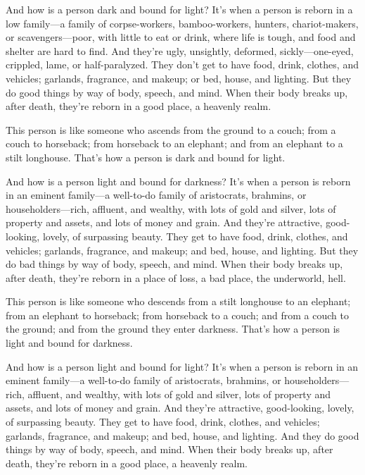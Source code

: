 \documentclass[12pt,openany]{book}%
\begin{document}
And how is a person dark and bound for light? It’s when a person is reborn in a low family—a family of corpse-workers, bamboo-workers, hunters, chariot-makers, or scavengers—poor, with little to eat or drink, where life is tough, and food and shelter are hard to find. And they’re ugly, unsightly, deformed, sickly—one-eyed, crippled, lame, or half-paralyzed. They don’t get to have food, drink, clothes, and vehicles; garlands, fragrance, and makeup; or bed, house, and lighting. But they do good things by way of body, speech, and mind. When their body breaks up, after death, they’re reborn in a good place, a heavenly realm. 

This person is like someone who ascends from the ground to a couch; from a couch to horseback; from horseback to an elephant; and from an elephant to a stilt longhouse. That’s how a person is dark and bound for light. 

And how is a person light and bound for darkness? It’s when a person is reborn in an eminent family—a well-to-do family of aristocrats, brahmins, or householders—rich, affluent, and wealthy, with lots of gold and silver, lots of property and assets, and lots of money and grain. And they’re attractive, good-looking, lovely, of surpassing beauty. They get to have food, drink, clothes, and vehicles; garlands, fragrance, and makeup; and bed, house, and lighting. But they do bad things by way of body, speech, and mind. When their body breaks up, after death, they’re reborn in a place of loss, a bad place, the underworld, hell. 

This person is like someone who descends from a stilt longhouse to an elephant; from an elephant to horseback; from horseback to a couch; and from a couch to the ground; and from the ground they enter darkness. That’s how a person is light and bound for darkness. 

And how is a person light and bound for light? It’s when a person is reborn in an eminent family—a well-to-do family of aristocrats, brahmins, or householders—rich, affluent, and wealthy, with lots of gold and silver, lots of property and assets, and lots of money and grain. And they’re attractive, good-looking, lovely, of surpassing beauty. They get to have food, drink, clothes, and vehicles; garlands, fragrance, and makeup; and bed, house, and lighting. And they do good things by way of body, speech, and mind. When their body breaks up, after death, they’re reborn in a good place, a heavenly realm. 
\end{document}
